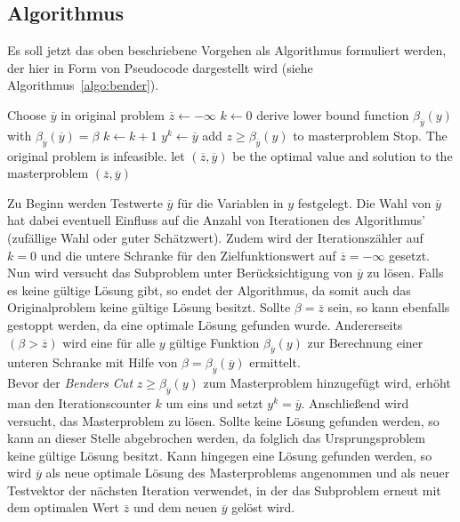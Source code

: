 \documentclass[a4paper, 11pt]{scrreprt}
\begin{document}
\subsection*{Algorithmus}
Es soll jetzt das oben beschriebene Vorgehen als Algorithmus formuliert werden, der hier in Form von
Pseudocode dargestellt wird (siehe Algorithmus~\ref{algo:bender}).
\begin{algorithm}[htb!]
  \centering
  \caption{}
  \label{algo:bender}
  \begin{algorithmic}[1]
    \STATE Choose $\overline{y}$ in original problem
    \STATE $\overline{z} \leftarrow -\infty$
    \STATE $k \leftarrow 0$
      \STATE derive lower bound function $\beta_{\overline{y}}(y)$ with $\beta_{\overline{y}}(\overline{y}) = \beta$
      \STATE $k \leftarrow k + 1$
      \STATE $y^k \leftarrow \overline{y}$
      \STATE add $z \geq \beta_{\overline{y}}(y)$ to masterproblem
        \STATE Stop. The original problem is infeasible.
      \ELSE
        \STATE let $(\overline{z}, \overline{y})$ be the optimal value and solution to the masterproblem
      \ENDIF
    \ENDWHILE
    \RETURN $(\overline{z}, \overline{y})$
  \end{algorithmic}
\end{algorithm}
Zu Beginn werden Testwerte $\overline{y}$ für die Variablen in $y$ festgelegt. Die Wahl von $\overline{y}$ hat dabei
eventuell Einfluss auf die Anzahl von Iterationen des Algorithmus' (zufällige Wahl oder guter Schätzwert).
Zudem wird der Iterationszähler auf $k = 0$ und die untere Schranke für den Zielfunktionswert auf
$\overline{z} = -\infty$ gesetzt.
Nun wird versucht das Subproblem unter Berücksichtigung von $\overline{y}$ zu lösen. Falls es keine gültige
Lösung gibt, so endet der Algorithmus, da somit auch das Originalproblem keine gültige Lösung besitzt.
Sollte $\beta = \overline{z}$ sein, so kann ebenfalls gestoppt werden, da eine optimale Lösung gefunden
wurde.
Andererseits $(\beta > \overline{z})$ wird eine für alle $y$ gültige Funktion $\beta_{\overline{y}}(y)$ zur Berechnung
einer unteren Schranke mit Hilfe von $\beta = \beta_{\overline{y}}(\overline{y})$ ermittelt.\\
Bevor der \textit{Benders Cut} $z \geq \beta_{\overline{y}}(y)$ zum Masterproblem hinzugefügt wird,
erhöht man den Iterationscounter $k$ um eins und setzt $y^k = \overline{y}$.
Anschließend wird versucht, das Masterproblem zu lösen. Sollte keine Lösung gefunden werden, so kann an
dieser Stelle abgebrochen werden, da folglich das Ursprungsproblem keine gültige Lösung besitzt.
Kann hingegen eine Lösung gefunden werden, so wird $\overline{y}$ als neue optimale Lösung
des Masterproblems angenommen und als neuer Testvektor der nächsten Iteration verwendet,
in der das Subproblem erneut mit dem optimalen Wert $\overline{z}$ und dem neuen $\overline{y}$
gelöst wird.
\end{document}
